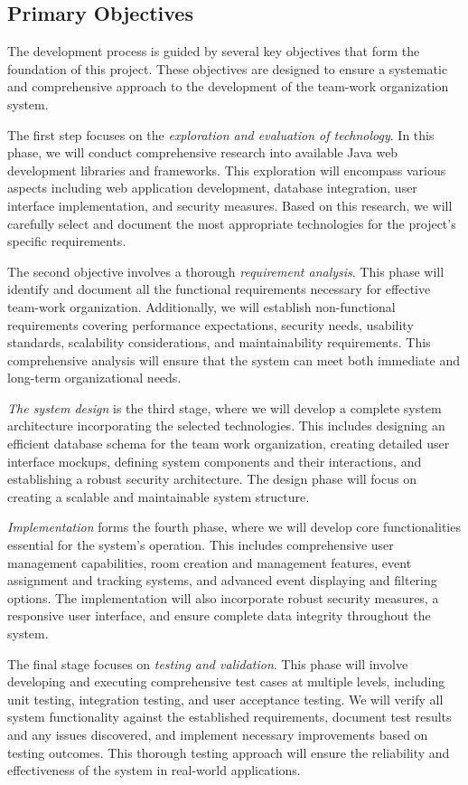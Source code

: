 \subsection{Primary Objectives}\label{subsec:primary-objectives}
The development process is guided by several key objectives that form the foundation of this project.
These objectives are designed to ensure a systematic and comprehensive approach to the development of the team-work organization system.

The first step focuses on the \textit{exploration and evaluation of technology}.
In this phase, we will conduct comprehensive research into available Java web development libraries and frameworks.
This exploration will encompass various aspects including web application development, database integration, user interface implementation, and security measures.
Based on this research, we will carefully select and document the most appropriate technologies for the project's specific requirements.

The second objective involves a thorough \textit{requirement analysis}.
This phase will identify and document all the functional requirements necessary for effective team-work organization.
Additionally, we will establish non-functional requirements covering performance expectations, security needs, usability standards, scalability considerations, and maintainability requirements.
This comprehensive analysis will ensure that the system can meet both immediate and long-term organizational needs.

\textit{The system design} is the third stage, where we will develop a complete system architecture incorporating the selected technologies.
This includes designing an efficient database schema for the team work organization, creating detailed user interface mockups, defining system components and their interactions, and establishing a robust security architecture.
The design phase will focus on creating a scalable and maintainable system structure.

\textit{Implementation} forms the fourth phase, where we will develop core functionalities essential for the system's operation.
This includes comprehensive user management capabilities, room creation and management features, event assignment and tracking systems, and advanced event displaying and filtering options.
The implementation will also incorporate robust security measures, a responsive user interface, and ensure complete data integrity throughout the system.

The final stage focuses on \textit{testing and validation}.
This phase will involve developing and executing comprehensive test cases at multiple levels, including unit testing, integration testing, and user acceptance testing.
We will verify all system functionality against the established requirements, document test results and any issues discovered, and implement necessary improvements based on testing outcomes.
This thorough testing approach will ensure the reliability and effectiveness of the system in real-world applications.
\newpage

